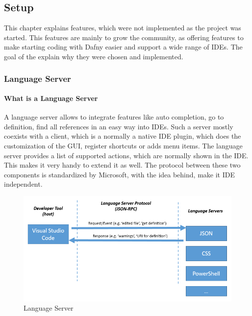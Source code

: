 \subsection{Setup}\label{setup}
This chapter explains features, which were not implemented as the project was started. This features are mainly to grow the community, as offering features to make starting coding with Dafny easier and support a wide range of IDEs. The goal of the explain why they were chosen and implemented. 
\subsubsection{Language Server} \label{setupLanguageServer}
\paragraph{What is a Language Server}
A language server allows to integrate features like auto completion, go to definition, find all references in an easy way into IDEs. Such a server mostly coexists with a client, which is a normally a native IDE plugin, which does the customization of the GUI, register shortcuts or adds menu items. The language server provides a list of supported actions, which are normally shown in the IDE. This makes it very handy to extend it as well. 
The protocol between these two components is standardized by Microsoft, with the idea behind, make it IDE independent. 
 \newline
\begin{figure}[H]
	\centering
	\includegraphics[width=1.0\textwidth]{img/languageServer}
	\caption{Language Server}
	\label{fig:languageServer}
\end{figure}
